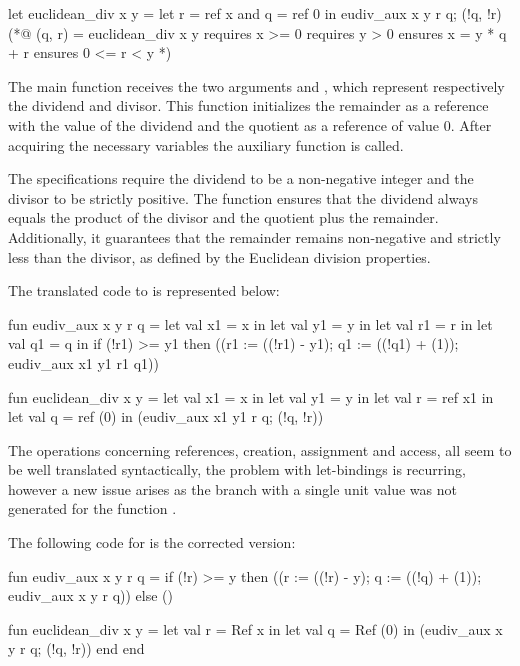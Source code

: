 \begin{gospell}
let euclidean_div x y =
    let r = ref x and q = ref 0 in 
  eudiv_aux x y r q;
  (!q, !r)
(*@ (q, r) = euclidean_div x y
    requires x >= 0
    requires y > 0
    ensures x = y * q + r
    ensures 0 <= r < y *)
\end{gospell}

The main function  receives the two arguments  and , which represent respectively
the dividend and divisor. This function initializes the remainder  as a reference with the value of the dividend 
 and the quotient  as a reference of value 0. After acquiring the necessary variables the auxiliary function 
is called.

The \gospel specifications require the dividend to be a non-negative integer and the divisor to be strictly positive. The function 
ensures that the dividend always equals the product of the divisor and the quotient plus the remainder. Additionally, it guarantees 
that the remainder remains non-negative and strictly less than the divisor, as defined by the Euclidean division properties.

The translated code to \cml is represented below:

\begin{cakeml}
fun eudiv_aux x y r q = let val x1 = x in
  let val y1 = y in
  let val r1 = r in
  let val q1 = q in
  if (!r1) >= y1
  then ((r1 := ((!r1) - y1); q1 := ((!q1) + (1)); eudiv_aux x1 y1 r1 q1))

fun euclidean_div x y =
  let val x1 = x in
  let val y1 = y in
  let val r = ref x1 in
  let val q = ref (0) in (eudiv_aux x1 y1 r q; (!q, !r))
\end{cakeml}

The operations concerning references, creation, assignment and access, all seem to be well translated syntactically, the problem with
let-bindings is recurring, however a new issue arises as the  branch with a single unit value was not generated for the 
function .

The following code for \cml is the corrected version:

\begin{cakeml}
fun eudiv_aux x y r q =
  if (!r) >= y
  then ((r := ((!r) - y); q := ((!q) + (1)); eudiv_aux x y r q))
  else ()

fun euclidean_div x y =
  let val r = Ref x in
  let val q = Ref (0) in (eudiv_aux x y r q; (!q, !r)) 
end end
\end{cakeml}

